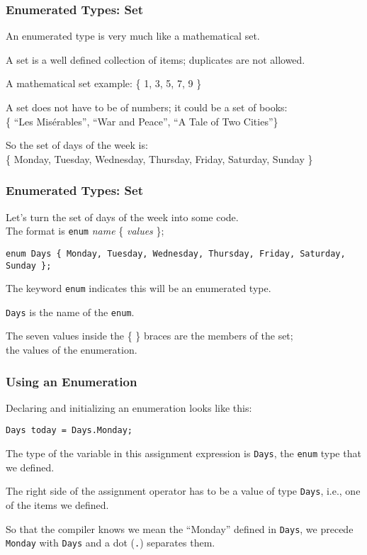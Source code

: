 \begin{frame}
\frametitle{Enumerated Types: Set}

An enumerated type is very much like a mathematical \alert{set}.

A set is a well defined collection of items; duplicates are not allowed.

A mathematical set example: \{ 1, 3, 5, 7, 9 \}

A set does not have to be of numbers; it could be a set of books:\\ \{ ``Les Mis\'{e}rables'', ``War and Peace'', ``A Tale of Two Cities''\}

So the set of days of the week is:\\
\{ Monday, Tuesday, Wednesday, Thursday, Friday, Saturday, Sunday \}

\end{frame}

\begin{frame}
\frametitle{Enumerated Types: Set}

Let's turn the set of days of the week into some code.\\
\quad The format is \texttt{enum} \textit{name} \{ \textit{values} \};

\texttt{enum Days \{ Monday, Tuesday, Wednesday, Thursday, Friday, Saturday, Sunday \};}

The keyword \texttt{enum} indicates this will be an enumerated type.

\texttt{Days} is the name of the \texttt{enum}.

The seven values inside the \{ \} braces are the members of the set;\\
\quad the values of the enumeration.


\end{frame}

\begin{frame}
\frametitle{Using an Enumeration}

Declaring and initializing an enumeration looks like this:

\texttt{Days today = Days.Monday;}

The type of the variable in this assignment expression is \texttt{Days}, the \texttt{enum} type that we defined.

The right side of the assignment operator has to be a value of type \texttt{Days}, i.e., one of the items we defined.

So that the compiler knows we mean the ``Monday'' defined in \texttt{Days}, we precede \texttt{Monday} with \texttt{Days} and a dot (\texttt{.}) separates them.

\end{frame}


